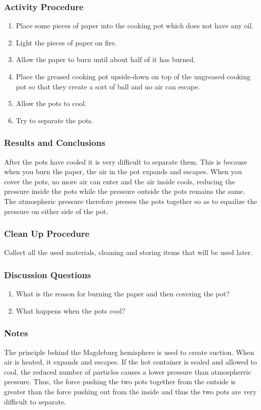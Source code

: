 \subsubsection*{Activity Procedure}
\begin{enumerate}
\item{Place some pieces of paper into the cooking pot which does not have any oil.} 
\item{Light the pieces of paper on fire.} 
\item{Allow the paper to burn until about half of it has burned.} 
\item{Place the greased cooking pot upside-down on top of the ungreased cooking pot so that they create a sort of ball and no air can escape.} 
\item{Allow the pots to cool.} 
\item{Try to separate the pots.} 
\end{enumerate}

\subsubsection*{Results and Conclusions}
After the pots have cooled it is very difficult to separate them. This is because when you burn the paper, the air in the pot expands and escapes. When you cover the pots, no more air can enter and the air inside cools, reducing the pressure inside the pots while the pressure outside the pots remains the same. The atmospheric pressure therefore presses the pots together so as to equalize the pressure on either side of the pot. 



\subsubsection*{Clean Up Procedure}
Collect all the used materials, cleaning and storing items that will be used later.

\subsubsection*{Discussion Questions}
\begin{enumerate}
\item{What is the reason for burning the paper and then covering the pot?}
\item{What happens when the pots cool?}
\end{enumerate}

\subsubsection*{Notes}
The principle behind the Magdeburg hemisphere is used to create suction. When air is heated, it expands and escapes. If the hot container is sealed and allowed to cool, the reduced number of particles causes a lower pressure than atmospherric pressure. Thus, the force pushing the two pots together from the outside is greater than the force pushing out from the inside and thus the two pots are very difficult to separate. 

